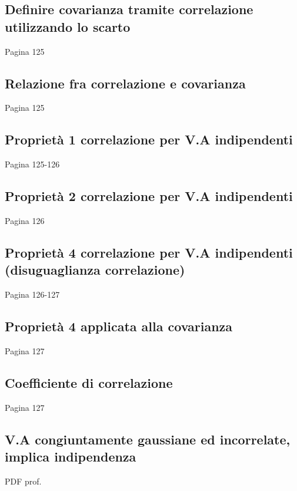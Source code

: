 \documentclass{article}
\begin{document}
\subsection{Definire covarianza tramite correlazione utilizzando lo scarto}
Pagina 125
\subsection{Relazione fra correlazione e covarianza}
Pagina 125
\subsection{Proprietà 1 correlazione per V.A indipendenti}
Pagina 125-126
\subsection{Proprietà 2 correlazione per V.A indipendenti}
Pagina 126
\subsection{Proprietà 4 correlazione per V.A indipendenti (disuguaglianza correlazione)}
Pagina 126-127
\subsection{Proprietà 4 applicata alla covarianza}
Pagina 127
\subsection{Coefficiente di correlazione}
Pagina 127
\subsection{V.A congiuntamente gaussiane ed incorrelate, implica indipendenza}
PDF prof.
\end{document}

